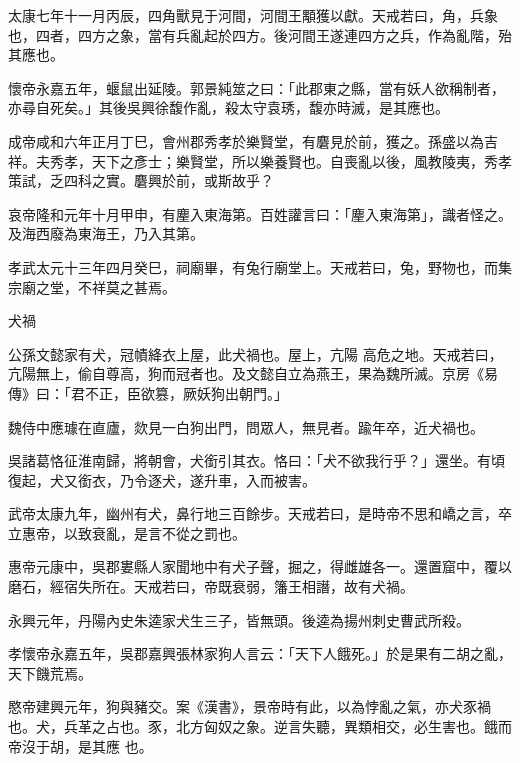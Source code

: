 \begin{pinyinscope}
 太康七年十一月丙辰，四角獸見于河間，河間王顒獲以獻。天戒若曰，角，兵象也，四者，四方之象，當有兵亂起於四方。後河間王遂連四方之兵，作為亂階，殆其應也。



 懷帝永嘉五年，蝘鼠出延陵。郭景純筮之曰：「此郡東之縣，當有妖人欲稱制者，亦尋自死矣。」其後吳興徐馥作亂，殺太守袁琇，馥亦時滅，是其應也。



 成帝咸和六年正月丁巳，會州郡秀孝於樂賢堂，有麏見於前，獲之。孫盛以為吉祥。夫秀孝，天下之彥士；樂賢堂，所以樂養賢也。自喪亂以後，風教陵夷，秀孝策試，乏四科之實。麏興於前，或斯故乎？



 哀帝隆和元年十月甲申，有麈入東海第。百姓讙言曰：「麈入東海第」，識者怪之。及海西廢為東海王，乃入其第。



 孝武太元十三年四月癸巳，祠廟畢，有兔行廟堂上。天戒若曰，兔，野物也，而集宗廟之堂，不祥莫之甚焉。



 犬禍



 公孫文懿家有犬，冠幘絳衣上屋，此犬禍也。屋上，亢陽
 高危之地。天戒若曰，亢陽無上，偷自尊高，狗而冠者也。及文懿自立為燕王，果為魏所滅。京房《易傳》曰：「君不正，臣欲篡，厥妖狗出朝門。」



 魏侍中應璩在直廬，欻見一白狗出門，問眾人，無見者。踰年卒，近犬禍也。



 吳諸葛恪征淮南歸，將朝會，犬銜引其衣。恪曰：「犬不欲我行乎？」還坐。有頃復起，犬又銜衣，乃令逐犬，遂升車，入而被害。



 武帝太康九年，幽州有犬，鼻行地三百餘步。天戒若曰，是時帝不思和嶠之言，卒立惠帝，以致衰亂，是言不從之罰也。



 惠帝元康中，吳郡婁縣人家聞地中有犬子聲，掘之，得雌雄各一。還置窟中，覆以磨石，經宿失所在。天戒若曰，帝既衰弱，籓王相譖，故有犬禍。



 永興元年，丹陽內史朱逵家犬生三子，皆無頭。後逵為揚州刺史曹武所殺。



 孝懷帝永嘉五年，吳郡嘉興張林家狗人言云：「天下人餓死。」於是果有二胡之亂，天下饑荒焉。



 愍帝建興元年，狗與豬交。案《漢書》，景帝時有此，以為悖亂之氣，亦犬豕禍也。犬，兵革之占也。豕，北方匈奴之象。逆言失聽，異類相交，必生害也。餓而帝沒于胡，是其應
 也。




\end{pinyinscope}
